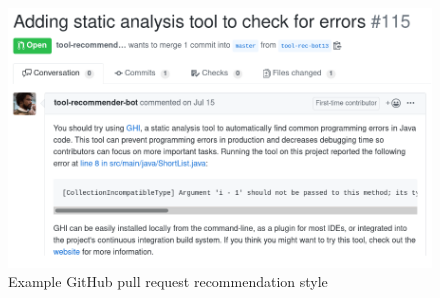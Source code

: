 \begin{figure}[H]
\centering
	\includegraphics[width=\textwidth]{Appendix-C/images/pull-rec.png}
	\caption{Example GitHub pull request recommendation style}	
	\label{fig:pull-rec} 
\end{figure}